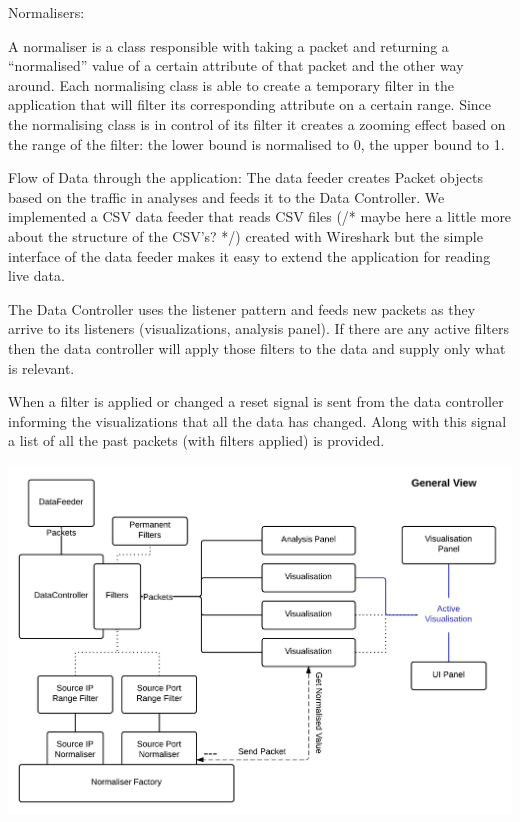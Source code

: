 Normalisers:

A normaliser is a class responsible with taking a packet and returning a ``normalised'' value of a certain attribute of that packet and the other way around. 
Each normalising class is able to create a temporary filter in the application that will filter its corresponding attribute on a certain range. 
Since the normalising class is in control of its filter it creates a zooming effect based on the range of the filter: the lower bound is normalised to 0, the upper bound to 1. 

Flow of Data through the application:
The data feeder creates Packet objects based on the traffic in analyses and feeds it to the Data Controller. 
We implemented a CSV data feeder that reads CSV files (/* maybe here a little more about the structure of the CSV's? */) created with Wireshark but the simple interface of the data feeder makes it easy to extend the application for reading live data.

The Data Controller uses the listener pattern and feeds new packets as they arrive to its listeners (visualizations, analysis panel).
If there are any active filters then the data controller will apply those filters to the data and supply only what is relevant.

When a filter is applied or changed a reset signal is sent from the data controller informing the visualizations that all the data has changed. Along with this signal a list of all the past packets (with filters applied) is provided.

\includegraphics[width=\linewidth]{materials/architecture.jpg}

